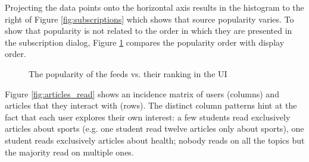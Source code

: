 Projecting the data points onto the horizontal axis results in the histogram to the right of Figure \ref{fig:subscriptions} which shows that source popularity varies. 
% 
To show that popularity is not related to the order in which they are presented in the subscription dialog, Figure \ref{fig:popularityvsranking} compares the popularity order with display  order. 


\begin{figure}[h!]
\centering
  
  \caption{The popularity of the feeds vs. their ranking in the UI}
  \label{fig:popularityvsranking}
\end{figure}



Figure \ref{fig:articles_read} shows an incidence matrix of users (columns) and articles that they interact with (rows). 
The distinct column patterns hint at the fact that each user explores their own interest:
  a few students read exclusively articles about sports (e.g. one student read twelve articles only about sports), 
  one student reads exclusively articles about health;
  nobody reads on all the topics but the majority read on multiple ones.

